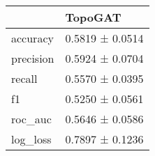 \begin{tabular}{ll}
\toprule
 & TopoGAT \\
\midrule
accuracy & 0.5819 ± 0.0514 \\
precision & 0.5924 ± 0.0704 \\
recall & 0.5570 ± 0.0395 \\
f1 & 0.5250 ± 0.0561 \\
roc_auc & 0.5646 ± 0.0586 \\
log_loss & 0.7897 ± 0.1236 \\
\bottomrule
\end{tabular}
